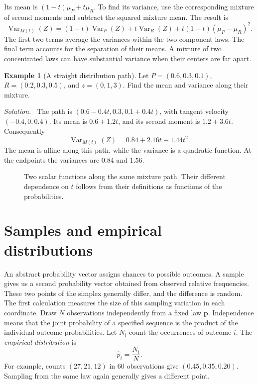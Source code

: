 \documentclass[11pt,oneside,openany]{book}
\theoremstyle{definition}
\newtheorem{example}{Example}[chapter]
\theoremstyle{remark}
\newenvironment{solution}{\par\smallskip\noindent\textit{Solution.}\ }{\par\smallskip}
\newcommand{\Var}{\operatorname{Var}}
\newcommand{\p}{\mathbf{p}}
\numberwithin{equation}{chapter}
\begin{document}
Its mean is $(1-t)\mu_P+t\mu_R$. To find its variance, use the corresponding mixture of second moments and subtract the squared mixture mean. The result is
\begin{equation}\label{eq:mixturevariance}
\Var_{M(t)}(Z)=(1-t)\Var_P(Z)+t\Var_R(Z)
+t(1-t)(\mu_P-\mu_R)^2.
\end{equation}
The first two terms average the variances within the two component laws. The final term accounts for the separation of their means. A mixture of two concentrated laws can have substantial variance when their centers are far apart.

\begin{example}[A straight distribution path]
Let $P=(0.6,0.3,0.1)$, $R=(0.2,0.3,0.5)$, and $z=(0,1,3)$. Find the mean and variance along their mixture.
\begin{solution}
The path is $(0.6-0.4t,0.3,0.1+0.4t)$, with tangent velocity $(-0.4,0,0.4)$. Its mean is $0.6+1.2t$, and its second moment is $1.2+3.6t$. Consequently
\[
\Var_{M(t)}(Z)=0.84+2.16t-1.44t^2.
\]
The mean is affine along this path, while the variance is a quadratic function. At the endpoints the variances are $0.84$ and $1.56$.
\end{solution}
\end{example}

\begin{figure}[htbp]
\centering
{}
\caption{Two scalar functions along the same mixture path. Their different dependence on $t$ follows from their definitions as functions of the probabilities.}
\end{figure}

\section{Samples and empirical distributions}
An abstract probability vector assigns chances to possible outcomes. A sample gives us a second probability vector obtained from observed relative frequencies. These two points of the simplex generally differ, and the difference is random. The first calculation measures the size of this sampling variation in each coordinate.
Draw $N$ observations independently from a fixed law $\p$. Independence means that the joint probability of a specified sequence is the product of the individual outcome probabilities. Let $N_i$ count the occurrences of outcome $i$. The \emph{empirical distribution} is
\[
\widehat p_i=\frac{N_i}{N}.
\]
For example, counts $(27,21,12)$ in 60 observations give $(0.45,0.35,0.20)$. Sampling from the same law again generally gives a different point.
\end{document}
